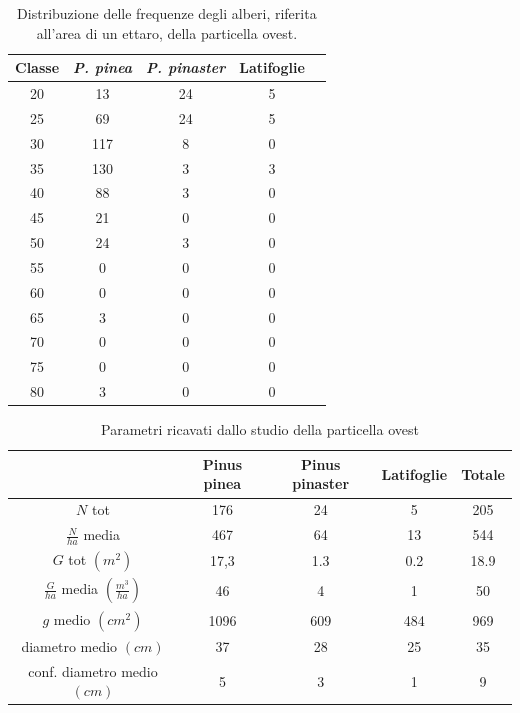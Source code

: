 \begin{table}[H]
\caption{Distribuzione delle frequenze degli alberi, riferita all'area di un ettaro, della particella ovest.}
\centering
\begin{tabular}{ccccc}
\toprule
Classe & \textit{P. pinea} & \textit{P. pinaster} & Latifoglie \\
\midrule
20     & 13                & 24                   & 5          \\
25     & 69                & 24                   & 5          \\
30     & 117               & 8                    & 0          \\
35     & 130               & 3                    & 3          \\
40     & 88                & 3                    & 0          \\
45     & 21                & 0                    & 0          \\
50     & 24                & 3                    & 0          \\
55     & 0                 & 0                    & 0          \\
60     & 0                 & 0                    & 0          \\
65     & 3                 & 0                    & 0          \\
70     & 0                 & 0                    & 0          \\
75     & 0                 & 0                    & 0          \\
80     & 3                 & 0                    & 0         \\
\bottomrule
\end{tabular}
\label{tab:tab_freq_aree_saggio_ovest}
\end{table}

\begin{table}[H]
  \caption{Parametri ricavati dallo studio della particella ovest}
    \centering
    \begin{tabular}{ccccc}
     \toprule
       & Pinus pinea & Pinus pinaster &  Latifoglie & Totale  \\
       \midrule
        $N$ tot & 176 & 24 & 5 & 205\\
        $\frac{N}{ha}$ media & 467 & 64 & 13 & 544\\
         $G$ tot $(m^2)$ & 17,3 & 1.3 & 0.2 & 18.9\\
        $\frac{G}{ha}$ media $(\frac{m^3}{ha})$ & 46 & 4 & 1 & 50\\
        $g$ medio $(cm^2)$ & 1096 & 609 & 484 & 969\\
        diametro medio  $(cm)$ & 37 & 28 & 25 & 35\\
        conf. diametro medio $(cm)$ & 5 & 3 & 1 & 9 \\
       \bottomrule
        \end{tabular}
    \label{tab:tab_areesaggio_ovest}
\end{table}

